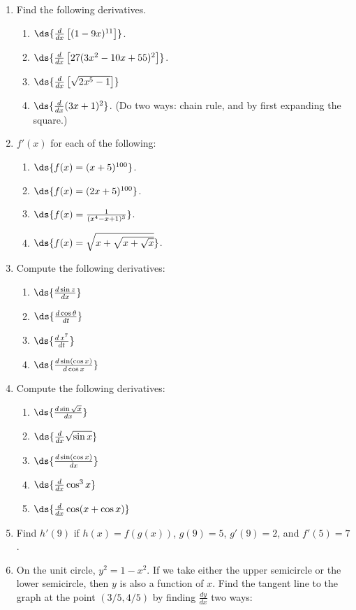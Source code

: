 \begin{multicols}{2}
\begin{enumerate}
\item Find the following derivatives.
\begin{enumerate}
\item $\ds{\frac{d}{dx}\left[(1-9x)^{11}\right]}$.
\item $\ds{\frac{d}{dx}\left[27(3x^2-10x+55)^2\right]}$.
\item $\ds{\frac{d}{dx}\left[\sqrt{2x^5-1}\right]}$
\item $\ds{\frac{d}{dx}(3x+1)^2}$.  (Do two ways: chain rule,
and by first expanding the square.)
\end{enumerate}
\item $f'(x)$ for each of the following:
\begin{enumerate}
\item $\ds{f(x)=(x+5)^{100}}$.
\item $\ds{f(x)=(2x+5)^{100}}$.
\item $\ds{f(x)=\frac{1}{(x^4-x+1)^3}}$.
\item $\ds{f(x)=\sqrt{x+\sqrt{x+\sqrt{x}}}}$.
\end{enumerate}
\item Compute the following derivatives:
\begin{enumerate}
\item $\ds{\frac{d\sin z}{dx}}$
\item $\ds{\frac{d\cos\theta}{dt}}$
\item $\ds{\frac{d\,x^7}{dt}}$
\item $\ds{\frac{d\sin(\cos x)}{d\cos x}}$
\end{enumerate}
\item Compute the following derivatives:
\begin{enumerate}
\item $\ds{\frac{d\sin\sqrt{x}}{dx}}$
\item $\ds{\frac{d}{dx}\sqrt{\sin x}}$
\item $\ds{\frac{d\sin(\cos x)}{dx}}$
\item $\ds{\frac{d}{dx}\cos^3x}$
\item $\ds{\frac{d}{dx}\cos(x+\cos x)}$
\end{enumerate}
\item Find $h'(9)$ if $h(x)=f(g(x))$, $g(9)=5$, $g'(9)=2$, and
        $f'(5)=7$.
\item On the unit circle, $y^2=1-x^2$.  If we take either the
upper semicircle or the lower semicircle, then $y$ is also
a function of $x$.  Find the tangent line to the graph at
the point $(3/5,4/5)$ by finding $\frac{dy}{dx}$ two ways:
\begin{enumerate}

\end{enumerate}
\end{enumerate}
\end{multicols}
